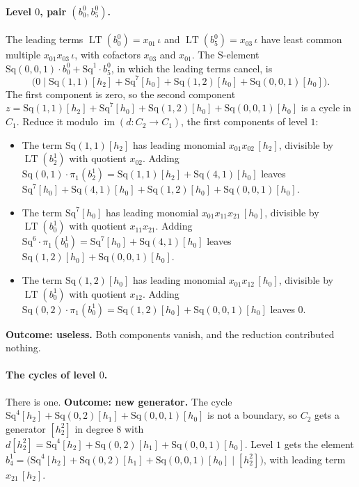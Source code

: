 \documentclass[11pt]{article}
\newcommand{\Sq}{\mathrm{Sq}}
\DeclareMathOperator{\LT}{LT}
\begin{document}
\paragraph{Level $0$, pair $(b^{0}_{0}, b^{0}_{5})$.} The leading terms $\LT(b^{0}_{0}) = x_{01}\,\iota$ and $\LT(b^{0}_{5}) = x_{03}\,\iota$ have least common multiple $x_{01}x_{03}\,\iota$, with cofactors $x_{03}$ and $x_{01}$. The S-element $\Sq(0,0,1)\cdot b^{0}_{0} + \Sq^{1}\cdot b^{0}_{5}$, in which the leading terms cancel, is
\[\bigl(0 \;\big|\; \Sq(1,1)[h_2] + \Sq^{7}[h_0] + \Sq(1,2)[h_0] + \Sq(0,0,1)[h_0]\bigr).\]
The first component is zero, so the second component $z = \Sq(1,1)[h_2] + \Sq^{7}[h_0] + \Sq(1,2)[h_0] + \Sq(0,0,1)[h_0]$ is a cycle in $C_{1}$.
Reduce it modulo $\operatorname{im}(d\colon C_{2}\to C_{1})$, the first components of level $1$:
\begin{itemize}
\item The term $\Sq(1,1)[h_2]$ has leading monomial $x_{01}x_{02}\,[h_2]$, divisible by $\LT(b^{1}_{2})$ with quotient $x_{02}$. Adding $\Sq(0,1)\cdot \pi_1(b^{1}_{2}) = \Sq(1,1)[h_2] + \Sq(4,1)[h_0]$ leaves $\Sq^{7}[h_0] + \Sq(4,1)[h_0] + \Sq(1,2)[h_0] + \Sq(0,0,1)[h_0]$.
\item The term $\Sq^{7}[h_0]$ has leading monomial $x_{01}x_{11}x_{21}\,[h_0]$, divisible by $\LT(b^{1}_{0})$ with quotient $x_{11}x_{21}$. Adding $\Sq^{6}\cdot \pi_1(b^{1}_{0}) = \Sq^{7}[h_0] + \Sq(4,1)[h_0]$ leaves $\Sq(1,2)[h_0] + \Sq(0,0,1)[h_0]$.
\item The term $\Sq(1,2)[h_0]$ has leading monomial $x_{01}x_{12}\,[h_0]$, divisible by $\LT(b^{1}_{0})$ with quotient $x_{12}$. Adding $\Sq(0,2)\cdot \pi_1(b^{1}_{0}) = \Sq(1,2)[h_0] + \Sq(0,0,1)[h_0]$ leaves $0$.
\end{itemize}
\textbf{Outcome: useless.} Both components vanish, and the reduction contributed nothing.
\medskip
\paragraph{The cycles of level $0$.} There is one.
\textbf{Outcome: new generator.} The cycle $\Sq^{4}[h_2] + \Sq(0,2)[h_1] + \Sq(0,0,1)[h_0]$ is not a boundary, so $C_{2}$ gets a generator $[h_2^2]$ in degree $8$ with $d[h_2^2] = \Sq^{4}[h_2] + \Sq(0,2)[h_1] + \Sq(0,0,1)[h_0]$.
Level $1$ gets the element $b^{1}_{4} = \bigl(\Sq^{4}[h_2] + \Sq(0,2)[h_1] + \Sq(0,0,1)[h_0] \;\big|\; [h_2^2]\bigr)$, with leading term $x_{21}\,[h_2]$.
\medskip
\end{document}
